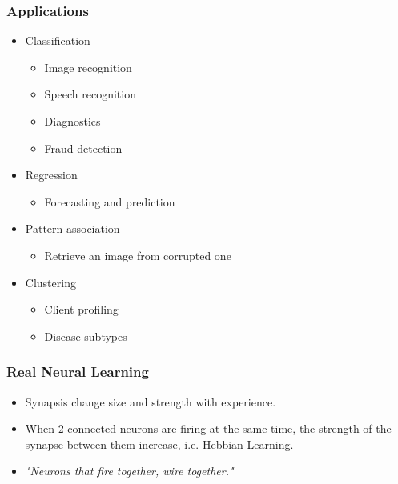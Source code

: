 \documentclass{beamer}
\begin{document}
\begin{frame}
    \frametitle{Applications}

    \begin{itemize}
        \item Classification
        \begin{itemize}
            \item Image recognition
            \item Speech recognition
            \item Diagnostics
            \item Fraud detection
        \end{itemize}
        \item Regression
        \begin{itemize}
            \item Forecasting and prediction
        \end{itemize}
        \item Pattern association
        \begin{itemize}
            \item Retrieve an image from corrupted one
        \end{itemize}
        \item Clustering
        \begin{itemize}
            \item Client profiling
            \item Disease subtypes
        \end{itemize}
    \end{itemize}

\end{frame}


\begin{frame}
    \frametitle{Real Neural Learning}

    \begin{itemize}
        \item Synapsis change size and strength with experience.
        \item When $2$ connected neurons are firing at the same time, the strength of the synapse between them increase, i.e. Hebbian Learning.
        \item \textit{"Neurons that fire together, wire together." }
    \end{itemize}


\end{frame}
\end{document}
